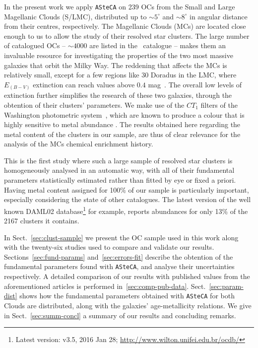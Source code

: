 \documentclass[a4paper,fleqn,usenatbib]{mnras}
\begin{document}
In the present work we apply \texttt{ASteCA} on 239 OCs from the Small and Large
Magellanic Clouds (S/LMC), distributed up to ${\sim}5^{\circ}$ and ${\sim}8^
{\circ}$ in angular distance from their centres, respectively.
%
The Magellanic Clouds (MCs) are located close enough to us to allow the study of
their resolved star clusters. The large number of catalogued
OCs -- $\sim4000$ are listed in the~\cite{Bica_2008} catalogue -- makes them an
invaluable resource for investigating the properties of the two most massive
galaxies that orbit the Milky Way.
%
The reddening that affects the MCs is relatively small,
except for a few regions like 30 Doradus in the LMC, where $E_{(B-V)}$
extinction can reach values above $0.4$ mag~\citep{Piatti_2015b}.
The overall low levels of extinction further simplifies the research of these
two galaxies, through the obtention of their clusters' parameters.
%
We make use of the $CT_1$ filters of the Washington photometric
system~\citep{Canterna_1976,Geisler_1996}, which are known to produce a colour
that is highly sensitive to metal abundance \citep{Geisler_1999}.
The results obtained here regarding the metal content of the clusters in our
sample, are thus of clear relevance for the analysis of the MCs chemical
enrichment history.

This is the first study where such a large sample of resolved star clusters is
homogeneously analysed in an automatic way, with all of their fundamental
parameters statistically estimated rather than fitted by eye or fixed a priori.
%
Having metal content assigned for 100\% of our sample is particularly
important, especially considering the state of other catalogues. The latest
version of the well known DAML02 database\footnote{Latest version: v3.5, 2016
Jan 28; \url{http://www.wilton.unifei.edu.br/ocdb/}}
\citep{Dias_2002} for example, reports abundances for only 13\% of the 2167
clusters it contains.

In Sect.~\ref{sec:clust-sample} we present the OC sample used in
this work along with the twenty-six studies used to compare and validate our
results.
Sections~\ref{sec:fund-params} and~\ref{sec:errors-fit} describe the obtention
of the fundamental parameters found with \texttt{ASteCA}, and analyse their
uncertainties respectively.
A detailed comparison of our results with published values from the
aforementioned articles is performed in~\ref{sec:comp-pub-data}.
Sect.~\ref{sec:param-dist} shows how the fundamental parameters obtained with
\texttt{ASteCA} for both Clouds are distributed, along with the galaxies'
age-metallicity relations.
We give in Sect.~\ref{sec:summ-concl} a summary of our results and concluding
remarks.
\end{document}

